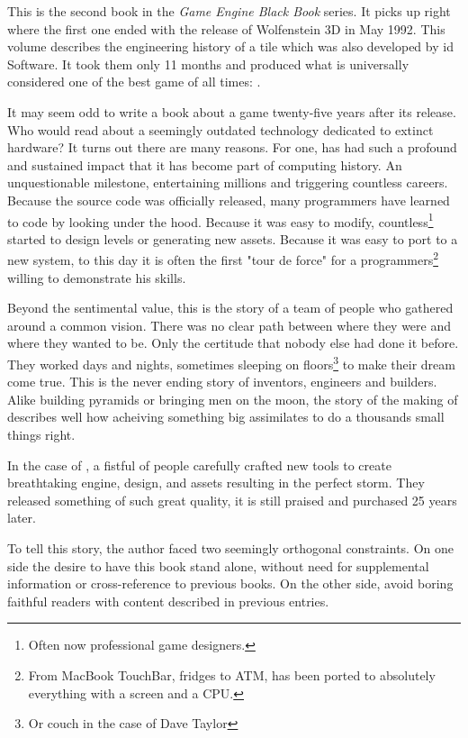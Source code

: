 This is the second book in the \textit{Game Engine Black Book} series. It picks up right where the first one ended with the release of Wolfenstein 3D in May 1992. This volume describes the engineering history of a tile which was also developed by id Software. It took them only 11 months and produced what is universally considered one of the best game of all times: \doom.\\
\par
It may seem odd to write a book about a game twenty-five years after its release. Who would read about a seemingly outdated technology dedicated to extinct hardware? It turns out there are many reasons. For one, \doom has had such a profound and sustained impact that it has become part of computing history. An unquestionable milestone, entertaining millions and triggering countless careers. Because the source code was officially released, many programmers have learned to code by looking under the hood. Because it was easy to modify, countless\footnote{Often now professional game designers.} started to design levels or generating new assets. Because it was easy to port to a new system, to this day it is often the first "tour de force" for a programmers\footnote{From MacBook TouchBar, fridges to ATM, \doom has been ported to absolutely everything with a screen and a CPU.} willing to demonstrate his skills.\\
\par
Beyond the sentimental value, this is the story of a team of people who gathered around a common vision. There was no clear path between where they were and where they wanted to be. Only the certitude that nobody else had done it before. They worked days and nights, sometimes sleeping on floors\footnote{Or couch in the case of Dave Taylor} to make their dream come true. This is the never ending story of inventors, engineers and builders. Alike building pyramids or bringing men on the moon, the story of the making of \doom describes well how acheiving something big assimilates to do a thousands small things right.\\
\par
In the case of \doom, a fistful of people carefully crafted new tools to create breathtaking engine, design, and assets resulting in the perfect storm. They released something of such great quality, it is still praised and purchased 25 years later.\\
\par
 To tell this story, the author faced two seemingly orthogonal constraints. On one side the desire to have this book stand alone, without need for supplemental information or cross-reference to previous books. On the other side, avoid boring faithful readers with content described in previous entries.\\

